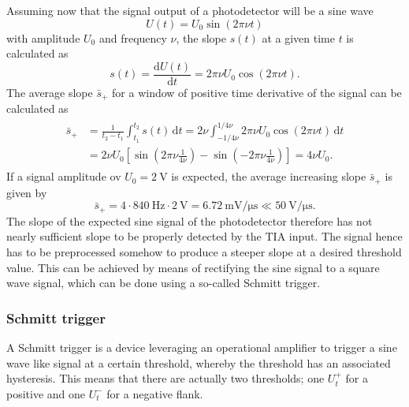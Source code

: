\documentclass{report}
\numberwithin{tm}{section}
\begin{document}
Assuming now that the signal output of a photodetector will be a sine wave \begin{equation}
	U(t) = U_0\sin(2\pi \nu t)
\end{equation} with amplitude $U_0$ and frequency $\nu$, the slope $s(t)$ at a given time $t$ is calculated as \begin{equation}
s(t) = \frac{\mathrm{d}U(t)}{\mathrm{d}t} = 2\pi \nu U_0\cos(2\pi\nu t).
\end{equation} The average slope $\bar{s}_+$ for a window of positive time derivative of the signal can be calculated as \begin{align}\begin{aligned}
\bar{s}_+ &= \frac{1}{t_2-t_1}\int_{t_1}^{t_2}s(t)\,\mathrm{d}t = 2\nu\int_{-1/4\nu}^{1/4\nu}2\pi\nu U_0\cos(2\pi\nu t)\,\mathrm{d}t \\ &= 2\nu U_0\left[\sin\left(2\pi\nu\frac{1}{4\nu}\right)-\sin\left(-2\pi\nu\frac{1}{4\nu}\right)\right]= 4\nu U_0.
\end{aligned}\end{align} If a signal amplitude ov $U_0 = \SI{2}{\volt}$ is expected, the average increasing slope $\bar{s}_+$ is given by \begin{equation}
\bar{s}_+ = 4\cdot \SI{840}{\hertz}\cdot \SI{2}{\volt} = \SI{6.72}{\milli\volt\per\micro\second}  \ll \SI{50}{\volt\per\micro\second}.
\end{equation} The slope of the expected sine signal of the photodetector therefore has not nearly sufficient slope to be properly detected by the TIA input. The signal hence has to be preprocessed somehow to produce a steeper slope at a desired threshold value. This can be achieved by means of rectifying the sine signal to a square wave signal, which can be done using a so-called Schmitt trigger.

\subsubsection{Schmitt trigger}
A Schmitt trigger is a device leveraging an operational amplifier to trigger a sine wave like signal at a certain threshold, whereby the threshold has an associated hysteresis. This means that there are actually two thresholds; one $U_t^+$ for a positive and one $U_t^-$ for a negative flank.
\end{document}
